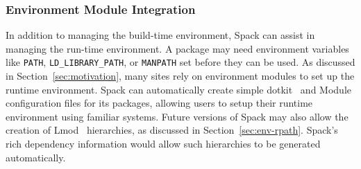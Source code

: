 \subsubsection{Environment Module Integration}
\label{sec:envmodule}
In addition to managing the build-time environment, Spack can assist in managing
the run-time environment.  A package may need environment variables like {\tt PATH}, 
{\tt LD_LIBRARY_PATH}, or {\tt MANPATH} set before they can be used.  
As discussed in Section~\ref{sec:motivation}, many sites rely on environment 
modules to set up the runtime environment.  Spack can automatically create simple
dotkit~\cite{dotkit} and Module configuration files for its packages, allowing 
users to setup their runtime environment using familiar systems.  
%
Future versions of Spack may also allow the creation of Lmod~\cite{mclay:lmod} 
hierarchies, as discussed in Section~\ref{sec:env-rpath}. Spack's rich 
dependency information would allow such hierarchies to be generated automatically.














